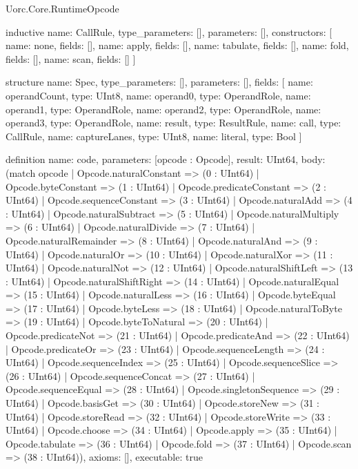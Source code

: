 \begin{lexlean}{Uorc.Core.RuntimeOpcode}
\begin{semanticmodule}
inductive{
  name: CallRule,
  type_parameters: [],
  parameters: [],
  constructors: [
    {name: none, fields: []},
    {name: apply, fields: []},
    {name: tabulate, fields: []},
    {name: fold, fields: []},
    {name: scan, fields: []}
  ]
}

structure{
  name: Spec,
  type_parameters: [],
  parameters: [],
  fields: [
    {name: operandCount, type: UInt8},
    {name: operand0, type: OperandRole},
    {name: operand1, type: OperandRole},
    {name: operand2, type: OperandRole},
    {name: operand3, type: OperandRole},
    {name: result, type: ResultRule},
    {name: call, type: CallRule},
    {name: captureLanes, type: UInt8},
    {name: literal, type: Bool}
  ]
}

definition{
  name: code,
  parameters: [opcode : Opcode],
  result: UInt64,
  body: (match opcode
    | Opcode.naturalConstant => (0 : UInt64)
    | Opcode.byteConstant => (1 : UInt64)
    | Opcode.predicateConstant => (2 : UInt64)
    | Opcode.sequenceConstant => (3 : UInt64)
    | Opcode.naturalAdd => (4 : UInt64)
    | Opcode.naturalSubtract => (5 : UInt64)
    | Opcode.naturalMultiply => (6 : UInt64)
    | Opcode.naturalDivide => (7 : UInt64)
    | Opcode.naturalRemainder => (8 : UInt64)
    | Opcode.naturalAnd => (9 : UInt64)
    | Opcode.naturalOr => (10 : UInt64)
    | Opcode.naturalXor => (11 : UInt64)
    | Opcode.naturalNot => (12 : UInt64)
    | Opcode.naturalShiftLeft => (13 : UInt64)
    | Opcode.naturalShiftRight => (14 : UInt64)
    | Opcode.naturalEqual => (15 : UInt64)
    | Opcode.naturalLess => (16 : UInt64)
    | Opcode.byteEqual => (17 : UInt64)
    | Opcode.byteLess => (18 : UInt64)
    | Opcode.naturalToByte => (19 : UInt64)
    | Opcode.byteToNatural => (20 : UInt64)
    | Opcode.predicateNot => (21 : UInt64)
    | Opcode.predicateAnd => (22 : UInt64)
    | Opcode.predicateOr => (23 : UInt64)
    | Opcode.sequenceLength => (24 : UInt64)
    | Opcode.sequenceIndex => (25 : UInt64)
    | Opcode.sequenceSlice => (26 : UInt64)
    | Opcode.sequenceConcat => (27 : UInt64)
    | Opcode.sequenceEqual => (28 : UInt64)
    | Opcode.singletonSequence => (29 : UInt64)
    | Opcode.basisGet => (30 : UInt64)
    | Opcode.storeNew => (31 : UInt64)
    | Opcode.storeRead => (32 : UInt64)
    | Opcode.storeWrite => (33 : UInt64)
    | Opcode.choose => (34 : UInt64)
    | Opcode.apply => (35 : UInt64)
    | Opcode.tabulate => (36 : UInt64)
    | Opcode.fold => (37 : UInt64)
    | Opcode.scan => (38 : UInt64)),
  axioms: [],
  executable: true
}


\end{semanticmodule}
\end{lexlean}
